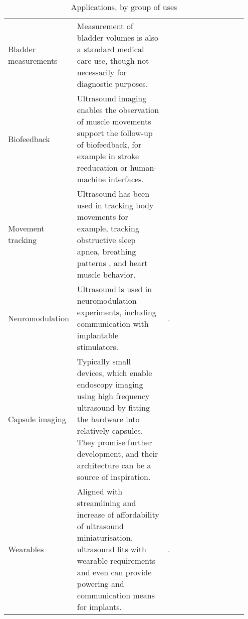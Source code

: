 \begin{table}[]
\begin{tabular}{p{0.15\linewidth} | p{0.40\linewidth} | p{0.40\linewidth} }
Bladder measurements
& Measurement of bladder volumes is also a standard medical care use, though not necessarily for diagnostic purposes.
& \cite{kuru_feasibility_2019}  &  \\

Biofeedback
& Ultrasound imaging enables the observation of muscle movements support the follow-up of biofeedback, for example in stroke reeducation or human-machine interfaces. & \cite{sosnowska_training_2019,sikdar_novel_2014,kwong_application_2020,yang_simultaneous_2020,li_human-machine_2016,boyd_ultrasound_2019,eshky_automatic_2021}       &  \\

Movement tracking 
& Ultrasound has been used in tracking body movements for example, tracking obstructive sleep apnea, breathing patterns , and heart muscle behavior.
& \cite{nguyen_estimating_2019,shahshahani_ultrasound_2018,weng_fpga-based_2015,fernandes_evaluation_2021}  &  \\
              
Neuromodulation                  
& Ultrasound is used in neuromodulation experiments, including communication with implantable stimulators.
& \cite{pashaei_flexible_2020,johnson_stimdust_2018, seo_wireless_2016, santagati_design_2020}.       &  \\

Capsule imaging                          & Typically small devices, which enable endoscopy imaging using high frequency ultrasound by fitting the hardware into relatively capsules. They promise further development, and their architecture can be a source of inspiration.  
& \cite{cox_ultrasound_2017, wang_development_2017,lee_towards_2014, memon_capsule_2016, lay_progress_2016, lay_-vivo_2018} &  \\

Wearables                        & Aligned with streamlining and increase of affordability of ultrasound miniaturisation, ultrasound fits with wearable requirements and even can provide powering and communication means for implants.
& \cite{basak_wearable_2013,kou_real-time_2020,yang_wearable_2019}.       &  \\

\end{tabular}

\caption{Applications, by group of uses}
\label{tab:applications}

\end{table}